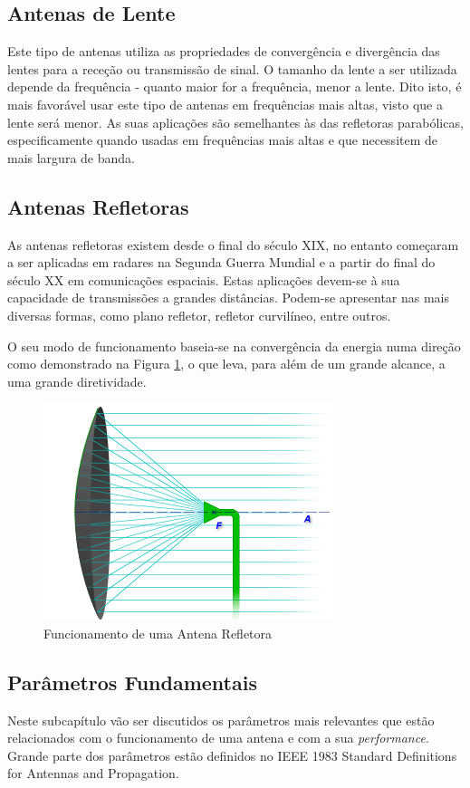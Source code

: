 \subsection*{Antenas de Lente}
Este tipo de antenas utiliza as propriedades de convergência e divergência das lentes para a receção ou transmissão de sinal. O tamanho da lente a ser utilizada depende da frequência - quanto maior for a frequência, menor a lente. Dito isto, é mais favorável usar este tipo de antenas em frequências mais altas, visto que a lente será menor. As suas aplicações são semelhantes às das refletoras parabólicas, especificamente quando usadas em frequências mais altas e que necessitem de mais largura de banda.

\subsection*{Antenas Refletoras}
As antenas refletoras existem desde o final do século XIX, no entanto começaram a ser aplicadas em radares na Segunda Guerra Mundial e a partir do final do século XX em comunicações espaciais. Estas aplicações devem-se à sua capacidade de transmissões a grandes distâncias. Podem-se apresentar nas mais diversas formas, como plano refletor, refletor curvilíneo, entre outros.\par 
O seu modo de funcionamento baseia-se na convergência da energia numa direção como demonstrado na Figura \ref{fig:reflector}, o que leva, para além de um grande alcance, a uma grande diretividade.

\begin{figure}[h]
\centering
\includegraphics[scale=0.6]{chapters/ch3/assets/reflector}
\caption[Antena Refletora]{Funcionamento de uma Antena Refletora}
\label{fig:reflector}
\end{figure}

\subsection{Parâmetros Fundamentais}
Neste subcapítulo vão ser discutidos os parâmetros mais relevantes que estão relacionados com o funcionamento de uma antena e com a sua \textit{performance}. Grande parte dos parâmetros estão definidos no IEEE 1983 Standard Definitions for Antennas and Propagation.

